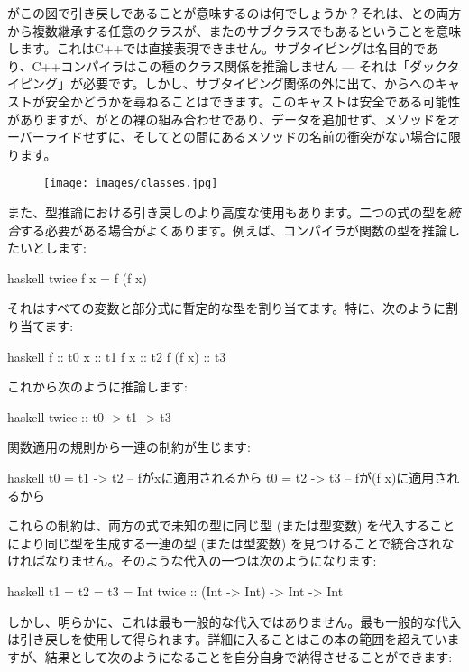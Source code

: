 がこの図で引き戻しであることが意味するのは何でしょうか？それは、との両方から複数継承する任意のクラスが、またのサブクラスでもあるということを意味します。これはC++では直接表現できません。サブタイピングは名目的であり、C++コンパイラはこの種のクラス関係を推論しません --- それは「ダックタイピング」が必要です。しかし、サブタイピング関係の外に出て、からへのキャストが安全かどうかを尋ねることはできます。このキャストは安全である可能性がありますが、がとの裸の組み合わせであり、データを追加せず、メソッドをオーバーライドせずに、そしてとの間にあるメソッドの名前の衝突がない場合に限ります。

\begin{figure}[H]
  \centering
  \texttt{[image: images/classes.jpg]}
\end{figure}

\noindent
また、型推論における引き戻しのより高度な使用もあります。二つの式の型を\emph{統合}する必要がある場合がよくあります。例えば、コンパイラが関数の型を推論したいとします: 

\begin{snip}{haskell}
twice f x = f (f x)
\end{snip}
それはすべての変数と部分式に暫定的な型を割り当てます。特に、次のように割り当てます: 

\begin{snip}{haskell}
f       :: t0
x       :: t1
f x     :: t2
f (f x) :: t3
\end{snip}
これから次のように推論します: 

\begin{snip}{haskell}
twice :: t0 -> t1 -> t3
\end{snip}
関数適用の規則から一連の制約が生じます: 

\begin{snip}{haskell}
t0 = t1 -> t2 -- fがxに適用されるから
t0 = t2 -> t3 -- fが(f x)に適用されるから
\end{snip}
これらの制約は、両方の式で未知の型に同じ型 (または型変数) を代入することにより同じ型を生成する一連の型 (または型変数) を見つけることで統合されなければなりません。そのような代入の一つは次のようになります: 

\begin{snip}{haskell}
t1 = t2 = t3 = Int
twice :: (Int -> Int) -> Int -> Int
\end{snip}
しかし、明らかに、これは最も一般的な代入ではありません。最も一般的な代入は引き戻しを使用して得られます。詳細に入ることはこの本の範囲を超えていますが、結果として次のようになることを自分自身で納得させることができます: 

